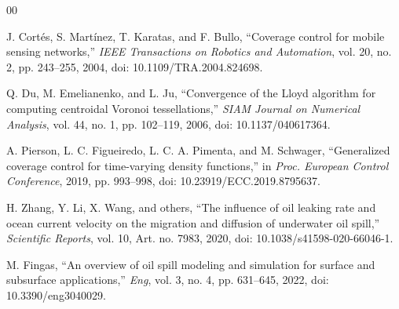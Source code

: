 \documentclass[conference]{IEEEtran}
\begin{document}
\begin{thebibliography}{00}

J. Cortés, S. Martínez, T. Karatas, and F. Bullo, ``Coverage control for mobile sensing networks,'' \textit{IEEE Transactions on Robotics and Automation}, vol. 20, no. 2, pp. 243--255, 2004, doi: 10.1109/TRA.2004.824698.

Q. Du, M. Emelianenko, and L. Ju, ``Convergence of the Lloyd algorithm for computing centroidal Voronoi tessellations,'' \textit{SIAM Journal on Numerical Analysis}, vol. 44, no. 1, pp. 102--119, 2006, doi: 10.1137/040617364.

A. Pierson, L. C. Figueiredo, L. C. A. Pimenta, and M. Schwager, ``Generalized coverage control for time-varying density functions,'' in \textit{Proc. European Control Conference}, 2019, pp. 993--998, doi: 10.23919/ECC.2019.8795637.

H. Zhang, Y. Li, X. Wang, and others, ``The influence of oil leaking rate and ocean current velocity on the migration and diffusion of underwater oil spill,'' \textit{Scientific Reports}, vol. 10, Art. no. 7983, 2020, doi: 10.1038/s41598-020-66046-1.

M. Fingas, ``An overview of oil spill modeling and simulation for surface and subsurface applications,'' \textit{Eng}, vol. 3, no. 4, pp. 631--645, 2022, doi: 10.3390/eng3040029.

\end{thebibliography}
\end{document}
